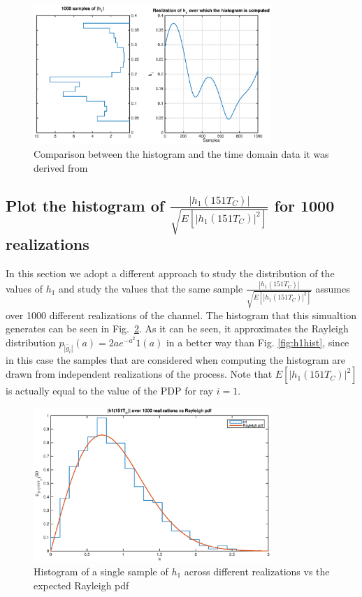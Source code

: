 \documentclass[10pt]{article}
\begin{document}
\begin{figure}[h!]
  \centering
  \includegraphics[width = 0.8\textwidth]{p02_h1hist}
  \caption{Comparison between the histogram and the time domain data it was derived from}
  \label{fig:h1histvstime}
\end{figure}

\subsection*{Plot the histogram of $\frac{|h_1(151T_C)|}{\sqrt{E[|h_1(151T_C)|^2]}}$ for 1000 realizations}
In this section we adopt a different approach to study the distribution of the values of $h_1$ and study the values that the same sample $\frac{|h_1(151T_C)|}{\sqrt{E[|h_1(151T_C)|^2]}}$ assumes over 1000 different realizations of the channel. The histogram that this simualtion generates can be seen in Fig.~\ref{fig:h1hist1000realizations}. As it can be seen, it approximates the Rayleigh distribution $p_{|\bar{g}_i|}(a) = 2a e^{-a^2} 1(a)$ in a better way than Fig. \ref{fig:h1hist}, since in this case the samples that are considered when computing the histogram are drawn from independent realizations of the process. Note that $E[|h_1(151T_C)|^2]$ is actually equal to the value of the PDP for ray $i=1$.

\begin{figure}[h!]
  \centering
  \includegraphics[width = 0.8\textwidth]{p03_h1hist}
  \caption{Histogram of a single sample of $h_1$ across different realizations vs the expected Rayleigh pdf}
  \label{fig:h1hist1000realizations}
\end{figure}
\end{document}
